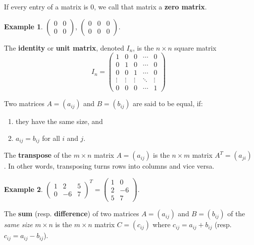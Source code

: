 \documentclass[
  12pt,
  oneside]{book}
\providecommand{\tightlist}{%
  \setlength{\itemsep}{0pt}\setlength{\parskip}{0pt}}
\theoremstyle{definition}
\theoremstyle{definition}
\newtheorem{example}{Example}[chapter]
\theoremstyle{definition}
\theoremstyle{definition}
\theoremstyle{remark}
\begin{document}
If every entry of a matrix is \(0\), we call that matrix a \textbf{zero matrix}.

\begin{example}
\protect\hypertarget{exm:unnamed-chunk-41}{}\label{exm:unnamed-chunk-41}\(\begin{pmatrix} 0 & 0\\ 0 & 0\end{pmatrix}\), \(\begin{pmatrix} 0 & 0 & 0\\ 0 & 0 & 0\end{pmatrix}\).
\end{example}

The \textbf{identity} or \textbf{unit matrix}, denoted \(I_n\), is the \(n\times n\) square matrix
\[
I_n = \begin{pmatrix} 1 & 0 & 0 & \cdots & 0\\
    0 & 1 & 0 & \cdots & 0\\
    0 & 0 & 1 & \cdots & 0\\
    \vdots & \vdots & \vdots & \ddots & \vdots \\
    0 & 0 & 0 & \cdots & 1
\end{pmatrix}
\]

Two matrices \(A=(a_{ij})\) and \(B=(b_{ij})\) are said to be equal, if:

\begin{enumerate}
\def\labelenumi{(\alph{enumi})}
\tightlist
\item
  they have the same size, and
\item
  \(a_{ij}=b_{ij}\) for all \(i\) and \(j\).
\end{enumerate}

The \textbf{transpose} of the \(m\times n\) matrix \(A=(a_{ij})\) is the \(n\times m\) matrix \(A^{T} = (a_{ji})\).
In other words, transposing turns rows into columns and vice versa.

\begin{example}
\protect\hypertarget{exm:unnamed-chunk-42}{}\label{exm:unnamed-chunk-42}\(\begin{pmatrix}1 & 2 & 5 \\ 0 & -6 & 7\end{pmatrix}^T = \begin{pmatrix}1&0\\2&-6\\5&7\end{pmatrix}\).
\end{example}

The \textbf{sum} (resp. \textbf{difference}) of two matrices \(A=(a_{ij})\) and \(B=(b_{ij})\) of the \emph{same size} \(m\times n\) is the \(m\times n\) matrix \(C=(c_{ij})\) where \(c_{ij}=a_{ij} + b_{ij}\) (resp. \(c_{ij}=a_{ij}-b_{ij}\)).
\end{document}
